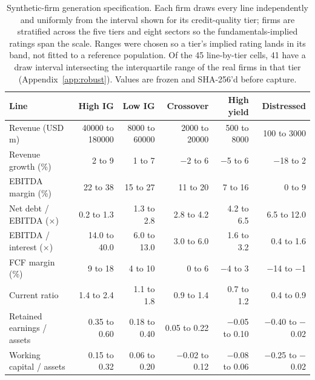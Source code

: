 \begin{table}[tb]\centering\small
\caption{Synthetic-firm generation specification. Each firm draws every line independently and uniformly from the interval shown for its credit-quality tier; firms are stratified across the five tiers and eight sectors so the fundamentals-implied ratings span the scale. Ranges were chosen so a tier's implied rating lands in its band, not fitted to a reference population. Of the 45 line-by-tier cells, 41 have a draw interval intersecting the interquartile range of the real firms in that tier (Appendix~\ref{app:robust}). Values are frozen and SHA-256'd before capture.}
\label{tab:firmspec}
\begin{tabular}{lrrrrr}
\toprule
Line & High IG & Low IG & Crossover & High yield & Distressed \\
\midrule
Revenue (USD m) & 40000 to 180000 & 8000 to 60000 & 2000 to 20000 & 500 to 8000 & 100 to 3000 \\
Revenue growth (\%) & 2 to 9 & 1 to 7 & $-$2 to 6 & $-$5 to 6 & $-$18 to 2 \\
EBITDA margin (\%) & 22 to 38 & 15 to 27 & 11 to 20 & 7 to 16 & 0 to 9 \\
Net debt / EBITDA ($\times$) & 0.2 to 1.3 & 1.3 to 2.8 & 2.8 to 4.2 & 4.2 to 6.5 & 6.5 to 12.0 \\
EBITDA / interest ($\times$) & 14.0 to 40.0 & 6.0 to 13.0 & 3.0 to 6.0 & 1.6 to 3.2 & 0.4 to 1.6 \\
FCF margin (\%) & 9 to 18 & 4 to 10 & 0 to 6 & $-$4 to 3 & $-$14 to $-$1 \\
Current ratio & 1.4 to 2.4 & 1.1 to 1.8 & 0.9 to 1.4 & 0.7 to 1.2 & 0.4 to 0.9 \\
Retained earnings / assets & 0.35 to 0.60 & 0.18 to 0.40 & 0.05 to 0.22 & $-$0.05 to 0.10 & $-$0.40 to $-$0.02 \\
Working capital / assets & 0.15 to 0.32 & 0.06 to 0.20 & $-$0.02 to 0.12 & $-$0.08 to 0.06 & $-$0.25 to $-$0.02 \\
\bottomrule
\end{tabular}\end{table}
